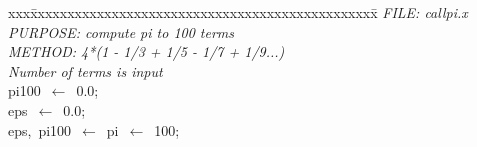 \documentclass{report}
\begin{document}
\pagestyle{empty}
\begin{tabbing}
xxx\=xxxxxxxxxxxxxxxxxxxxxxxxxxxxxxxxxxxxxxxxxxxxxxx\=\kill
{\tt{}}{\em{} FILE:    callpi.x
}\\
{\tt{}}{\em{} PURPOSE: compute pi to 100 terms
}\\
{\tt{}}{\em{} METHOD:  4*(1 - 1/3 + 1/5 - 1/7 + 1/9...)
}\\
{\tt{}}{\em{}          Number of terms is input
}\\
pi100\ $\leftarrow$\ 0.0;\\
eps\ $\leftarrow$\ 0.0;\\
eps,\ pi100\ $\leftarrow$\ pi\ $\leftarrow$\ 100;\\
\end{tabbing}
\end{document}
